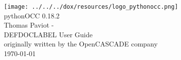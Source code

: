 \documentclass[oneside]{article}
\begin{document}
\hypersetup{pageanchor=false}
\begin{titlepage}
\vspace*{7cm}
\begin{center}%
\texttt{[image: ../../../dox/resources/logo\_pythonocc.png]}\\
\vspace*{1cm}
{\Large pythonOCC 0.18.2}\\
{\small Thomas Paviot - }\\
\vspace*{1cm}
{\Large DEFDOCLABEL User Guide}\\
{\small originally written by the OpenCASCADE company}\\

\vspace*{1cm}
{\small \today}\
\end{center}
\end{titlepage}
\clearpage
{}
\tableofcontents
\newpage
{}
\hypersetup{pageanchor=true}

\let\stdsection\section
  \renewcommand\section{\pagebreak\stdsection}
\hypertarget{DEFFILENAME}{}


\newpage
{}
{}
\printindex\n
\end{document}
